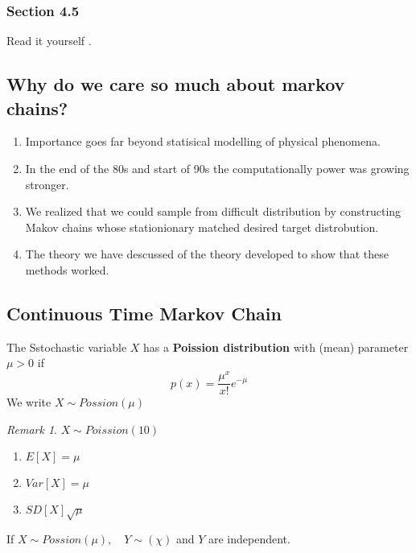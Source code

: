 \documentclass{article}
\theoremstyle{remark}
\newtheorem*{remark}{Remark}
\begin{document}
\subsubsection{Section 4.5}%
\label{ssub:section_4_5}
Read it yourself .


\subsection{Why do we care so much about markov chains?}%
\label{sub:why_do_we_care_so_much_about_markov_chains_}

\begin{enumerate}[label=(\roman*)]
  \item Importance goes far beyond statisical modelling of physical phenomena.
  \item In the end of the 80s and start of 90s the computationally power was growing stronger.
  \item We realized that we could sample from difficult distribution  by constructing Makov chains whose stationionary matched desired target distrobution.
  \item The theory we have descussed of the theory developed to show that these methods worked.
\end{enumerate}

\subsection{Continuous Time Markov Chain}%
\label{sub:continuous_time_markov_chain}


\begin{definition}
  The Sstochastic variable $X$  has a \textbf{Poission distribution}  with (mean) parameter $\mu > 0$ if \[
  p\left( x \right) = \frac{\mu ^{x}}{x!}  e^{- \mu }
  \] 
  We write $X \sim Possion (\mu )$
\end{definition}

\begin{remark}
  $X \sim Poission (10)$
   \begin{enumerate}[label=(\roman*)]
    \item $E\left[ X \right] = \mu $
    \item $Var\left[ X \right] = \mu $
    \item $SD\left[ X \right] \sqrt{\mu } $
  \end{enumerate}
\end{remark}

\begin{theorem}
  If $X \sim Possion (\mu ), \quad  Y \sim \left( \chi  \right) $ and $Y $ are independent. 
\end{theorem}
\end{document}
